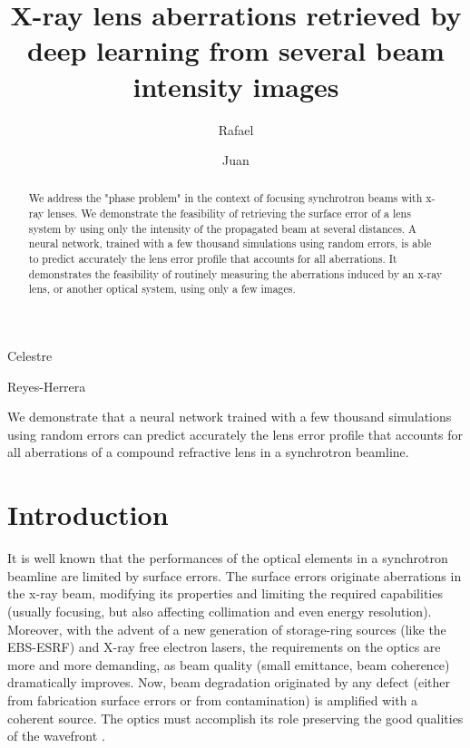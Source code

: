 \documentclass[preprint]{iucr}
\newcommand{\jsrblue}[1]{\textcolor{JSR_blue}{#1}}
\begin{document}
   

\title{X-ray lens aberrations retrieved by deep learning from several beam intensity images}

\cauthor[a]{\jsrblue{Manuel}}{\jsrblue{Sanchez del Rio}}{srio@esrf.eu}{}

\author[a]{\jsrblue{Rafael}}{\jsrblue{Celestre}}
\author[a]{\jsrblue{Juan}}{\jsrblue{Reyes-Herrera}} 


\maketitle                        %

\begin{synopsis}
We demonstrate that a neural network trained with a few thousand simulations using random errors can predict accurately the lens error profile that accounts for all aberrations of a compound refractive lens in a synchrotron beamline. 
\end{synopsis}

\begin{abstract}
We address the "phase problem" in the context of focusing synchrotron beams with x-ray lenses. We demonstrate the feasibility of retrieving the surface error of a lens system by using only the intensity of the propagated beam at several distances. A neural network, trained with a few thousand simulations using random errors, is able to predict accurately the lens error profile that accounts for all aberrations. It demonstrates the feasibility of routinely measuring the aberrations induced by an x-ray lens, or another optical system, using only a few images. 
\end{abstract}




\section{Introduction}\label{sec:intro}

It is well known that the performances of the optical elements in  a synchrotron beamline are limited by surface errors. The surface errors originate aberrations in the x-ray beam, modifying its properties and limiting the required capabilities (usually focusing, but also affecting collimation and even energy resolution). Moreover, with the advent of a new generation of storage-ring sources (like the EBS-ESRF) and X-ray free electron lasers, the requirements on the optics are more and more demanding, as beam quality (small emittance, beam coherence) dramatically improves.  Now, beam degradation originated by any defect (either from fabrication surface errors or from contamination) is amplified with a coherent source. The optics must accomplish its role preserving the good qualities of the wavefront \cite{Cocco2022}. 
\end{document}
